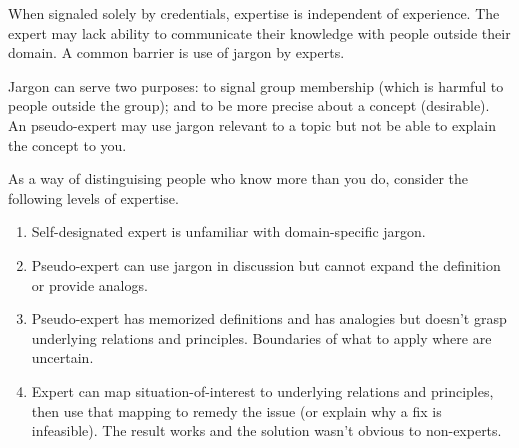 When signaled solely by credentials, expertise is independent of experience. The expert may lack ability to communicate their knowledge with people outside their domain. A common barrier is use of jargon by experts.

Jargon can serve two purposes: to signal group membership (which is harmful to people outside the group); and to be more precise about a concept (desirable). An pseudo-expert may use jargon relevant to a topic but not be able to explain the concept to you.

As a way of distinguising people who know more than you do, consider the following levels of expertise.
\begin{enumerate}
    \item Self-designated expert is unfamiliar with domain-specific jargon.
    \item Pseudo-expert can use jargon in discussion but cannot expand the definition or provide analogs.
    \item Pseudo-expert has memorized definitions and has analogies but doesn't grasp underlying relations and principles. Boundaries of what to apply where are uncertain.
    \item Expert can map situation-of-interest to underlying relations and principles, then use that mapping to remedy the issue (or explain why a fix is infeasible). The result works and the solution wasn't obvious to non-experts.
\end{enumerate}







